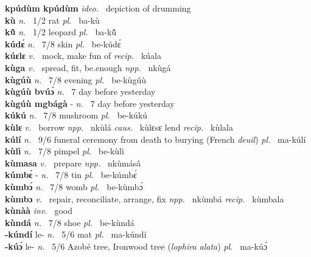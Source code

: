 {\bfseries kpúdùm kpúdùm}  {\itshape ideo.~} depiction of drumming    \\ 
{\bfseries kù}  {\itshape n.~} 1/2 rat {\itshape pl.~} ba-kù    \\ 
{\bfseries kũ̂}  {\itshape n.~} 1/2 leopard {\itshape pl.~} ba-kũ̂    \\ 
{\bfseries kúdɛ́}  {\itshape n.~} 7/8 skin {\itshape pl.~} be-kúdɛ́    \\ 
{\bfseries kúɛlɛ}  {\itshape v.~} mock, make fun of   {\itshape recip.~} kúala  \\ 
{\bfseries kùga}  {\itshape v.~} spread, fit, be.enough   {\itshape npp.~} nkùgá  \\ 
{\bfseries kùgúù}  {\itshape n.~} 7/8 evening {\itshape pl.~} be-kùgúù    \\ 
{\bfseries kùgúù bvúɔ̀}  {\itshape n.~} 7 day before yesterday    \\ 
{\bfseries kùgúù mgbágà} - {\itshape n.~} 7 day before yesterday    \\ 
{\bfseries kúkú}  {\itshape n.~} 7/8 mushroom {\itshape pl.~} be-kúkú    \\ 
{\bfseries kùlɛ}  {\itshape v.~} borrow   {\itshape npp.~} nkùlá {\itshape caus.~} kùlɛsɛ lend {\itshape recip.~} kùlala  \\ 
{\bfseries kúlí}  {\itshape n.~} 9/6 funeral ceremony from death to burying (French {\itshape deuil}) {\itshape pl.~} ma-kúlí    \\ 
{\bfseries kùlì}  {\itshape n.~} 7/8 pimpel {\itshape pl.~} be-kùlì    \\ 
{\bfseries kùmasa}  {\itshape v.~} prepare   {\itshape npp.~} nkùmásâ  \\ 
{\bfseries kúmbɛ́} - {\itshape n.~} 7/8 tin {\itshape pl.~} be-kúmbɛ́    \\ 
{\bfseries kùmbɔ́}  {\itshape n.~} 7/8 womb {\itshape pl.~} be-kùmbɔ́    \\ 
{\bfseries kùmbɔ}  {\itshape v.~} repair, reconciliate, arrange, fix   {\itshape npp.~} nkùmbá {\itshape recip.~} kùmbala  \\ 
{\bfseries kùnàà}  {\itshape inv.~} good    \\ 
{\bfseries kùndá}  {\itshape n.~} 7/8 shoe {\itshape pl.~} be-kùndá    \\ 
{\bfseries -kúndí} le- {\itshape n.~} 5/6 mat {\itshape pl.~} ma-kúndí    \\ 
{\bfseries -kúɔ́} le- {\itshape n.~} 5/6 Azobé tree, Ironwood tree ({\itshape lophira alata}) {\itshape pl.~} ma-kúɔ́    \\ 
